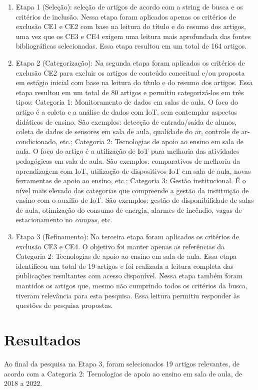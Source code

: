 \documentclass[portuguese]{textolivre}
\begin{document}
\begin{enumerate}
    \item Etapa 1 (Seleção): seleção de artigos de acordo com a string de busca e os critérios de inclusão. Nessa etapa foram aplicados apenas os critérios de exclusão CE1 e CE2 com base na leitura do título e do resumo dos artigos, uma vez que os CE3 e CE4 exigem uma leitura mais aprofundada das fontes bibliográficas selecionadas. Essa etapa resultou em um total de 164 artigos.
    \item Etapa 2 (Categorização): Na segunda etapa foram aplicados os critérios de exclusão CE2 para excluir os artigos de conteúdo conceitual e/ou proposta em estágio inicial com base na leitura do título e do resumo dos artigos. Essa etapa resultou em um total de 80 artigos e permitiu categorizá-los em três tipos:
    \subitem Categoria 1: Monitoramento de dados em salas de aula. O foco do artigo é a coleta e a análise de dados com IoT, sem contemplar aspectos didáticos de ensino. São exemplos: detecção de entrada/saída de alunos, coleta de dados de sensores em sala de aula, qualidade do ar, controle de ar-condicionado, etc.;
    \subitem Categoria 2: Tecnologias de apoio ao ensino em sala de aula. O foco do artigo é a utilização de IoT para melhoria das atividades pedagógicas em sala de aula. São exemplos: comparativos de melhoria da aprendizagem com IoT, utilização de dispositivos IoT em sala de aula, novas ferramentas de apoio ao ensino, etc.;
    \subitem Categoria 3: Gestão institucional. É o nível mais elevado das categorias que compreende a gestão da instituição de ensino com o auxílio de IoT. São exemplos: gestão de disponibilidade de salas de aula, otimização do consumo de energia, alarmes de incêndio, vagas de estacionamento no \textit{campus}, etc.
    \item Etapa 3 (Refinamento): Na terceira etapa foram aplicados os critérios de exclusão CE3 e CE4. O objetivo foi manter apenas as referências da Categoria 2: Tecnologias de apoio ao ensino em sala de aula. Essa etapa identificou um total de 19 artigos e foi realizada a leitura completa das publicações resultantes com acesso disponível. Nessa etapa também foram mantidos os artigos que, mesmo não cumprindo todos os critérios da busca, tiveram relevância para esta pesquisa. Essa leitura permitiu responder às questões de pesquisa propostas.
\end{enumerate}

\section{Resultados}\label{sec-fmt-manuscrito}
Ao final da pesquisa na Etapa 3, foram selecionados 19 artigos relevantes, de acordo com a Categoria 2: Tecnologias de apoio ao ensino em sala de aula, de 2018 a 2022. 
\end{document}
